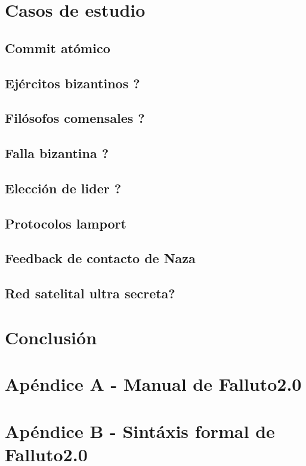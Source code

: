 \documentclass[titlepage, 12pt]{book}
\begin{document}

\chapter{Casos de estudio}
			\section{Commit at\'omico}
			\section{Ej\'ercitos bizantinos ?}
			\section{Fil\'osofos comensales ?}
			\section{Falla bizantina ?}
			\section{Elecci\'on de lider ?}
			\section{Protocolos lamport}
			\section{Feedback de contacto de Naza}
			\section{Red satelital ultra secreta?}


\chapter{Conclusi\'on}

\chapter{Ap\'endice A - Manual de Falluto2.0}

\chapter{Ap\'endice B - Sint\'axis formal de Falluto2.0}
\end{document}
